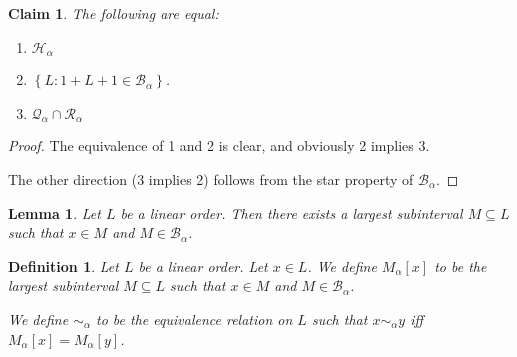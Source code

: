 \documentclass{article}
\newtheorem{lemma}{Lemma}
\newtheorem{claim}{Claim}
\newtheorem{definition}{Definition}
\newcommand{\braces}[1]{\left\{ {#1} \right\}}
\newcommand{\setcomp}[1]{\braces{#1}}
\begin{document}
\begin{claim}
  The following are equal:

  \begin{enumerate}
    \item $\mathcal{H}_{\alpha}$
    \item $\setcomp{L : 1 + L + 1 \in \mathcal{B}_{\alpha}}$.
    \item $\mathcal{Q}_{\alpha} \cap \mathcal{R}_{\alpha}$
  \end{enumerate}

\end{claim}

\begin{proof}
  The equivalence of 1 and 2 is clear, and obviously
  2 implies 3.

  The other direction (3 implies 2) follows from the star property
  of $\mathcal{B}_{\alpha}$.
\end{proof}

\begin{lemma}
  Let $L$ be a linear order. Then there exists a largest subinterval $M \subseteq L$ such that
  $x \in M$ and $M \in \mathcal{B}_{\alpha}$.
\end{lemma}

\begin{definition}
  Let $L$ be a linear order. Let $x \in L$. We define $M_{\alpha}[x]$ to be the largest subinterval
  $M \subseteq L$ such that $x \in M$ and $M \in \mathcal{B}_{\alpha}$.

  We define $\sim_{\alpha}$ to be the equivalence relation on $L$ such that $x \sim_{\alpha} y$ iff
  $M_{\alpha}[x] = M_{\alpha}[y]$.
\end{definition}
\end{document}
